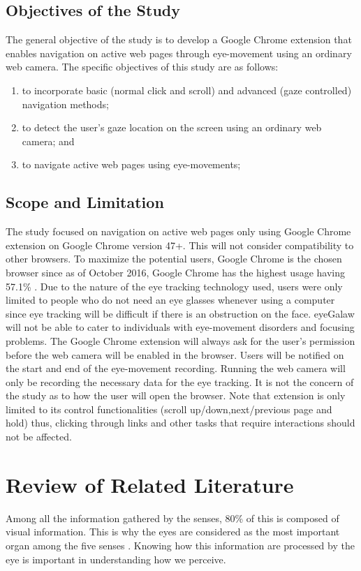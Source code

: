 \documentclass[journal]{./IEEE/IEEEtran}
\begin{document}
\subsection{Objectives of the Study}
The general objective of the study is to develop a Google Chrome extension that enables navigation on active web pages through eye-movement using an ordinary web camera. The specific objectives of this study are as follows:
\begin{enumerate}
\item to incorporate basic (normal click and scroll) and advanced (gaze controlled) navigation methods;
\item to detect the user’s gaze location on the screen using an ordinary web camera; and
\item to navigate active web pages using eye-movements;
\end{enumerate}

\subsection{Scope and Limitation}
The study focused on navigation on active web pages only using Google Chrome extension on Google Chrome version 47+. This will not consider compatibility to other browsers. To maximize the potential users, Google Chrome is the chosen browser since as of October 2016, Google Chrome has the highest usage having 57.1\% \cite{w3counter_global_web_stats}. Due to the nature of the eye tracking technology used, users were only limited to people who do not need an eye glasses whenever using a computer since eye tracking will be difficult if there is an obstruction on the face. eyeGalaw will not be able to cater to individuals with eye-movement disorders and focusing problems. The Google Chrome extension will always ask for the user’s permission before the web camera will be enabled in the browser. Users will be notified on the start and end of the eye-movement recording. Running the web camera will only be recording the necessary data for the eye tracking. It is not the concern of the study as to how the user will open the browser. Note that extension is only limited to its control functionalities (scroll up/down,next/previous page and hold) thus, clicking through links and other tasks that require interactions should not be affected. 

\section{Review of Related Literature}
Among all the information gathered by the senses, 80\% of this is composed of visual information. This is why the eyes are considered as the most important organ among the five senses \cite{gordon_1989}. Knowing how this information are processed by the eye is important in understanding how we perceive. 
\end{document}
